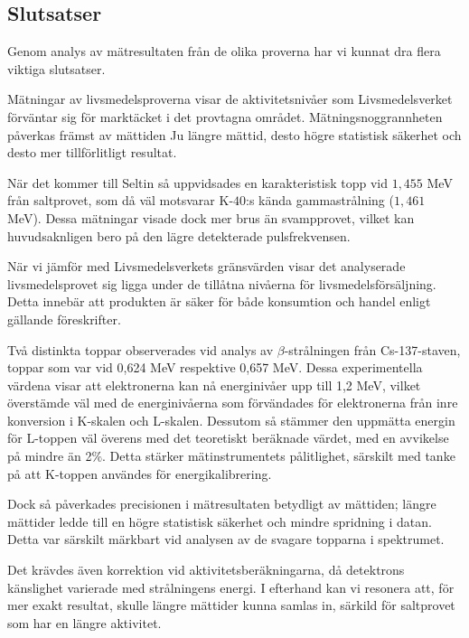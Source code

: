 \subsection{Slutsatser} \label{sec:conclusions}

Genom analys av mätresultaten från de olika proverna har vi kunnat dra flera viktiga slutsatser. 

\indent

Mätningar av livsmedelsproverna visar de aktivitetsnivåer som Livsmedelsverket \parencite{livsmedelsverket} förväntar sig för marktäcket i det provtagna området. Mätningsnoggrannheten påverkas främst av mättiden Ju längre mättid, desto högre statistisk säkerhet och desto mer tillförlitligt resultat.

När det kommer till Seltin så uppvidsades en karakteristisk topp vid $1,455$ MeV från saltprovet, som då väl motsvarar K-$40$:s kända gammastrålning ($1,461$ MeV).
Dessa mätningar visade dock mer brus än svampprovet, vilket kan huvudsaknligen bero på den lägre detekterade pulsfrekvensen.

\indent

När vi jämför med Livsmedelsverkets gränsvärden visar det analyserade livsmedelsprovet sig ligga under de tillåtna nivåerna för livsmedelsförsäljning. Detta innebär att produkten är säker för både konsumtion och handel enligt gällande föreskrifter.


Två distinkta toppar observerades vid analys av $\beta$-strålningen från Cs-137-staven, toppar som var vid 0,624 MeV respektive 0,657 MeV. Dessa experimentella värdena visar att elektronerna kan nå energinivåer upp till 1,2 MeV, vilket överstämde väl med de energinivåerna som förvändades för elektronerna från inre konversion i K-skalen och L-skalen.
Dessutom så stämmer den uppmätta energin för L-toppen väl överens med det teoretiskt beräknade värdet, med en avvikelse på mindre än 2$\%$. Detta stärker mätinstrumentets pålitlighet, särskilt med tanke på att K-toppen användes för energikalibrering.

\indent

Dock så påverkades precisionen i mätresultaten betydligt av mättiden; längre mättider ledde till en högre statistisk säkerhet och mindre spridning i datan. Detta var särskilt märkbart vid analysen av de svagare topparna i spektrumet.

Det krävdes även korrektion vid aktivitetsberäkningarna, då detektrons känslighet varierade med strålningens energi. I efterhand kan vi resonera att, för mer exakt resultat, skulle längre mättider kunna samlas in, särkild för saltprovet som har en längre aktivitet.


